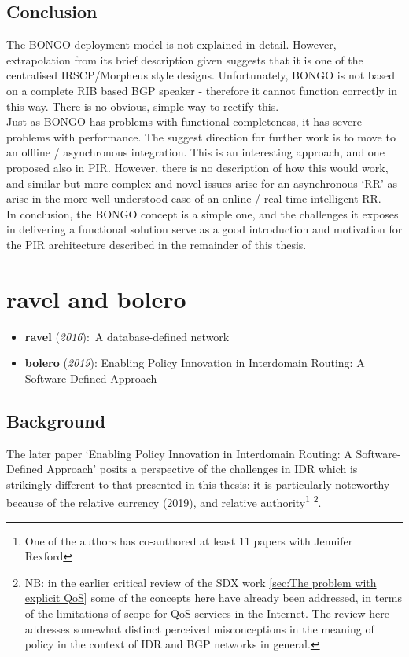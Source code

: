 \subsection{Conclusion}
The BONGO deployment model is not explained in detail. However, extrapolation from its brief description given suggests that it is one of the centralised IRSCP/Morpheus style designs.
Unfortunately, BONGO is not based on a complete RIB based BGP speaker - therefore it cannot function correctly in this way.  There is no obvious, simple way to rectify this.
\\
Just as BONGO has problems with functional completeness, it has severe problems with performance.
The suggest direction for further work is to move to an offline / asynchronous integration.
This is an interesting approach, and one proposed also in PIR.  However, there is no description of how this would work, and similar but more complex and novel issues arise for an asynchronous `RR' as arise in the more well understood case of an online / real-time intelligent RR.
\\
In conclusion, the BONGO concept is a simple one, and the challenges it exposes in delivering a functional solution serve as a good introduction and motivation for the PIR architecture described in the remainder of this thesis.


\section{ravel and bolero}

\begin{itemize}

	\item {\textbf{ravel} (\textit{2016}):~A database-defined network
	      \cite{Wang2016}}

	\item {\textbf{bolero} (\textit{2019}): Enabling Policy Innovation in Interdomain Routing: A Software-Defined Approach \cite{Wang2019}}

\end{itemize}

\subsection{Background}\label{subsection-Bolero}

The later paper `Enabling Policy Innovation in Interdomain Routing: A
Software-Defined Approach' posits a perspective of the challenges in IDR which
is strikingly different to that presented in this thesis: it is particularly
noteworthy because of the relative currency (2019), and relative authority\footnote{One of the authors has co-authored at least 11 papers with Jennifer Rexford}
\footnote{NB: in the earlier critical review of the SDX work \ref{sec:The problem with explicit QoS}
some of the concepts here have already been addressed, in terms of the limitations of scope for QoS services in the Internet.  The review here addresses somewhat distinct perceived misconceptions in the meaning of policy in the context of IDR and BGP networks in general.}.

